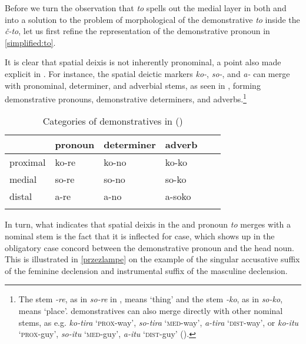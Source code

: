 \vskip 0.25cm
\noindent Before we turn the observation that \textit{to} spells out the medial layer in both  and  into a solution to the problem of morphological  of the demonstrative \textit{to} inside the  \textit{\v{c}-to}, let us first refine the representation of the demonstrative pronoun in \ref{simplified:to}.
\par
It is clear that spatial deixis is not inherently pronominal, a point also made explicit in \cite{Lander-Haegeman2016}. For instance, the  spatial deictic markers \textit{ko-}, \textit{so-}, and \textit{a-} can merge with pronominal, determiner, and adverbial stems, as seen in , forming demonstrative pronouns, demonstrative determiners, and  adverbs.\footnote{The stem \textit{-re}, as in \textit{so-re} in  , means `thing' and the stem \textit{-ko}, as in \textit{so-ko}, means `place'.  demonstratives can also merge directly with other nominal stems, as e.g. \textit{ko-tira} `\textsc{prox}-way', \textit{so-tira} `\textsc{med}-way', \textit{a-tira} `\textsc{dist}-way', or \textit{ko-itu} `\textsc{prox}-guy', \textit{so-itu} `\textsc{med}-guy', \textit{a-itu} `\textsc{dist}-guy' (\citealt[97]{Hoji-etal2003}). 
} %

\begin{table}[H]
\caption{Categories of demonstratives in  (\citealt{Kuno1973})}
\label{Jap:stems} 
\begin{tabular}[h]{ l l l l l l }
\lsptoprule	
		& pronoun 	& determiner 	& adverb\\\midrule
proximal	& ko-re		& ko-no		& ko-ko\\
medial	& so-re		& so-no		& so-ko\\
distal		& a-re		& a-no		& a-soko\\
\lspbottomrule
\end{tabular}
\end{table}

In turn, what indicates that spatial deixis in the  and   pronoun \textit{to} merges with a nominal stem is the fact that it is inflected for case, which shows up in the obligatory case concord between the demonstrative pronoun and the head noun. This is illustrated in \ref{przezlampe} on the example of the  singular accusative suffix of the feminine declension and instrumental suffix of the masculine declension.

